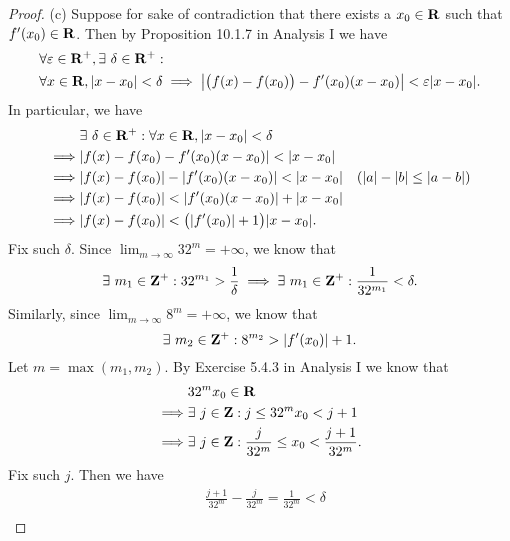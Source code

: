 \begin{proof}{(c)}
  Suppose for sake of contradiction that there exists a \(x_0 \in \mathbf{R}\) such that \(f'(x_0) \in \mathbf{R}\).
  Then by Proposition 10.1.7 in Analysis I we have
  \begin{align*}
     & \forall \varepsilon \in \R^+, \exists\ \delta \in \R^+ :                                                                         \\
     & \forall x \in \R, \abs{x - x_0} < \delta \implies \abs{\big(f(x) - f(x_0)\big) - f'(x_0) (x - x_0)} < \varepsilon \abs{x - x_0}.
  \end{align*}
  In particular, we have
  \begin{align*}
             & \exists\ \delta \in \R^+ : \forall x \in \R, \abs{x - x_0} < \delta                                        \\
    \implies & \abs{f(x) - f(x_0) - f'(x_0) (x - x_0)} < \abs{x - x_0}                                                    \\
    \implies & \abs{f(x) - f(x_0)} - \abs{f'(x_0) (x - x_0)} < \abs{x - x_0}       & (\abs{a} - \abs{b} \leq \abs{a - b}) \\
    \implies & \abs{f(x) - f(x_0)} < \abs{f'(x_0) (x - x_0)} + \abs{x - x_0}                                              \\
    \implies & \abs{f(x) - f(x_0)} < \big(\abs{f'(x_0)} + 1\big) \abs{x - x_0}.
  \end{align*}
  Fix such \(\delta\).
  Since \(\lim_{m \to \infty} 32^m = +\infty\), we know that
  \[
    \exists\ m_1 \in \mathbf{Z}^+ : 32^{m_1} > \frac{1}{\delta} \implies \exists\ m_1 \in \mathbf{Z}^+ : \frac{1}{32^{m_1}} < \delta.
  \]
  Similarly, since \(\lim_{m \to \infty} 8^m = +\infty\), we know that
  \[
    \exists\ m_2 \in \mathbf{Z}^+ : 8^{m_2} > \left\lvert f'(x_0)\right\rvert + 1.
  \]
  Let \(m = \max(m_1, m_2)\).
  By Exercise 5.4.3 in Analysis I we know that
  \begin{align*}
             & 32^m x_0 \in \mathbf{R}                                                   \\
    \implies & \exists\ j \in \mathbf{Z} : j \leq 32^m x_0 < j + 1                       \\
    \implies & \exists\ j \in \mathbf{Z} : \frac{j}{32^m} \leq x_0 < \frac{j + 1}{32^m}.
  \end{align*}
  Fix such \(j\).
  Then we have
  \begin{align*}
             & \frac{j + 1}{32^m} - \frac{j}{32^m} = \frac{1}{32^m} < \delta                                                                                            \\

\end{align*}
\end{proof}
